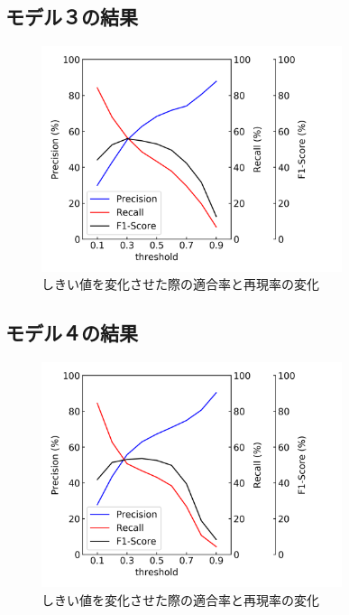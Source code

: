 \newpage
\subsection{モデル３の結果}
\begin{figure}[htbp]
    \begin{center}
        \includegraphics[width=88mm]{./fig/resnet3d_mthreshold.png}
        \caption{しきい値を変化させた際の適合率と再現率の変化}
        \label{fig:resnet3d_m_result_threshold}
    \end{center}
\end{figure}

\subsection{モデル４の結果}
\begin{figure}[htbp]
    \begin{center}
        \includegraphics[width=88mm]{./fig/resnet3d_e_mthreshold.png}
        \caption{しきい値を変化させた際の適合率と再現率の変化}
        \label{fig:resnet3d_e_m_result_threshold}
    \end{center}
\end{figure}
